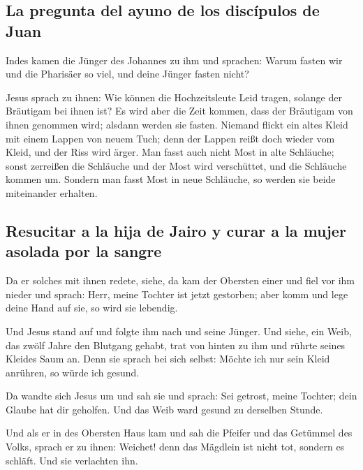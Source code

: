 \hypertarget{la-pregunta-del-ayuno-de-los-discuxedpulos-de-juan}{%
\subsection{La pregunta del ayuno de los discípulos de
Juan}\label{la-pregunta-del-ayuno-de-los-discuxedpulos-de-juan}}

 Indes kamen die Jünger des Johannes zu ihm und sprachen:
Warum fasten wir und die Pharisäer so viel, und deine Jünger fasten
nicht?

 Jesus sprach zu ihnen: Wie können die Hochzeitsleute
Leid tragen, solange der Bräutigam bei ihnen ist? Es wird aber die Zeit
kommen, dass der Bräutigam von ihnen genommen wird; alsdann werden sie
fasten.  Niemand flickt ein altes Kleid mit einem Lappen
von neuem Tuch; denn der Lappen reißt doch wieder vom Kleid, und der
Riss wird ärger.  Man fasst auch nicht Most in alte
Schläuche; sonst zerreißen die Schläuche und der Most wird verschüttet,
und die Schläuche kommen um. Sondern man fasst Most in neue Schläuche,
so werden sie beide miteinander erhalten.

\hypertarget{resucitar-a-la-hija-de-jairo-y-curar-a-la-mujer-asolada-por-la-sangre}{%
\subsection{Resucitar a la hija de Jairo y curar a la mujer asolada por
la
sangre}\label{resucitar-a-la-hija-de-jairo-y-curar-a-la-mujer-asolada-por-la-sangre}}

 Da er solches mit ihnen redete, siehe, da kam der
Obersten einer und fiel vor ihm nieder und sprach: Herr, meine Tochter
ist jetzt gestorben; aber komm und lege deine Hand auf sie, so wird sie
lebendig.

 Und Jesus stand auf und folgte ihm nach und seine
Jünger.  Und siehe, ein Weib, das zwölf Jahre den
Blutgang gehabt, trat von hinten zu ihm und rührte seines Kleides Saum
an.  Denn sie sprach bei sich selbst: Möchte ich nur sein
Kleid anrühren, so würde ich gesund.

 Da wandte sich Jesus um und sah sie und sprach: Sei
getrost, meine Tochter; dein Glaube hat dir geholfen. Und das Weib ward
gesund zu derselben Stunde.

 Und als er in des Obersten Haus kam und sah die Pfeifer
und das Getümmel des Volks,  sprach er zu ihnen: Weichet!
denn das Mägdlein ist nicht tot, sondern es schläft. Und sie verlachten
ihn.

